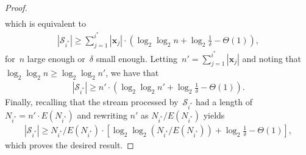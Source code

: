\documentclass[sigconf]{acmart}
\begin{document}
\begin{proof}
\begin{align*}
    \end{align*}
    which is equivalent to
    \begin{align*}
        |\mathcal{S}_{i^*}| \geq \sum_{j=1}^{i^*} |\mathbf{x}_j| \cdot \left( \log_2\log_2 n + \log_2 \frac{1}{\delta} - \Theta(1) \right),
    \end{align*}
    for~$n$ large enough or~$\delta$ small enough. Letting~$n' =
    \sum_{j=1}^{i^*} |\mathbf{x}_j|$ and noting that~$\log_2\log_2 n \geq
    \log_2\log_2 n'$, we have that 
    \begin{align*}
        |\mathcal{S}_{i^*}| \geq n' \cdot \left( \log_2\log_2 n' + \log_2 \frac{1}{\delta} - \Theta(1) \right).
    \end{align*}
    Finally, recalling that the stream processed by~$\mathcal{S}_{i^*}$ had a
    length of~$N_{i^*}=n' \cdot E(N_{i^*})$ and rewriting $n'$ as
    $N_{i^*}/E(N_{i^*})$ yields
    \begin{align*}
        |\mathcal{S}_{i^*}| \geq N_{i^*}/E(N_{i^*}) \cdot \left[ \log_2\log_2 (N_{i^*}/E(N_{i^*})) + \log_2 \frac{1}{\delta} - \Theta(1) \right],
    \end{align*}
    which proves the desired result.
\end{proof}
\fi
\end{document}
